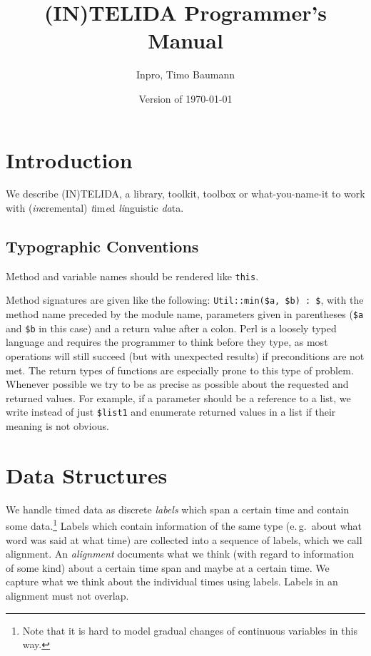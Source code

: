 \documentclass[a4,twoside=off,draft=true]{scrartcl}
\begin{document}
\title{(IN)TELIDA Programmer's Manual}
\subject{Inpro Technical Document 2009/03-893X3Ma2}
\author{Inpro, Timo Baumann}
\date{Version of \today}

\maketitle
\tableofcontents
\clearpage

\section{Introduction}

We describe (IN)TELIDA, a library, toolkit, toolbox or what-you-name-it 
to work with (\emph{in}cremental) \emph{t}im\emph{e}d \emph{li}nguistic \emph{da}ta.

\subsection{Typographic Conventions}

Method and variable names should be rendered like {\tt this}. 

Method signatures are given like the following: 
{\tt Util::min(\$a, \$b) :\ \$}, with the method name preceded by the module name,
parameters given in parentheses ({\tt \$a} and {\tt \$b} in this case) and a return
value after a colon. Perl is a loosely typed language and requires the programmer
to think before they type, as most operations will still succeed (but with unexpected
results) if preconditions are not met. The return types of functions are especially
prone to this type of problem.
Whenever possible we try to be as precise as possible about 
the requested and returned values. For example, if a parameter should be a reference
to a list, we write {\tt {}} instead of just {\tt \$list1} and
enumerate returned values in a list if their meaning is not obvious.

\section{Data Structures}

We handle timed data as discrete \emph{labels} which span a certain time and contain some 
data.\footnote{
 Note that it is hard to model gradual changes of continuous variables in this way. 
}
Labels which contain information of the same type (e.\,g.\ about what word was said at what time)
are collected into a sequence of labels, which we call alignment. 
An \emph{alignment} documents what we think (with regard to information of some kind) about a certain
time span and maybe at a certain time. We capture what we think about the individual times
using labels. Labels in an alignment must not overlap. 
\end{document}
